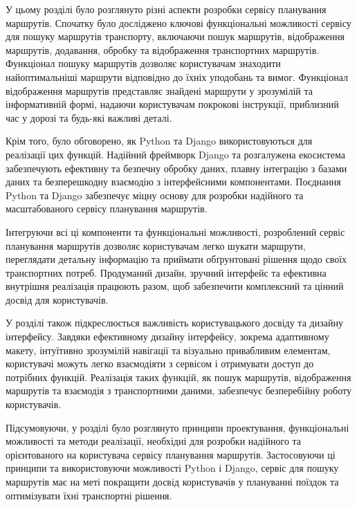
У цьому розділі було розглянуто різні аспекти розробки сервісу планування маршрутів. Спочатку було досліджено ключові функціональні можливості сервісу для пошуку маршрутів транспорту, включаючи пошук маршрутів, відображення маршрутів, додавання, обробку та відображення транспортних маршрутів. Функціонал пошуку маршрутів дозволяє користувачам знаходити найоптимальніші маршрути відповідно до їхніх уподобань та вимог. Функціонал відображення маршрутів представляє знайдені маршрути у зрозумілій та інформативній формі, надаючи користувачам покрокові інструкції, приблизний час у дорозі та будь-які важливі деталі.

Крім того, було обговорено, як Python та Django використовуються для реалізації цих функцій. Надійний фреймворк Django та розгалужена екосистема забезпечують ефективну та безпечну обробку даних, плавну інтеграцію з базами даних та безперешкодну взаємодію з інтерфейсними компонентами. Поєднання Python та Django забезпечує міцну основу для розробки надійного та масштабованого сервісу планування маршрутів.

Інтегруючи всі ці компоненти та функціональні можливості, розроблений сервіс планування маршрутів дозволяє користувачам легко шукати маршрути, переглядати детальну інформацію та приймати обґрунтовані рішення щодо своїх транспортних потреб. Продуманий дизайн, зручний інтерфейс та ефективна внутрішня реалізація працюють разом, щоб забезпечити комплексний та цінний досвід для користувачів.

У розділі також підкреслюється важливість користувацького досвіду та дизайну інтерфейсу. Завдяки ефективному дизайну інтерфейсу, зокрема адаптивному макету, інтуїтивно зрозумілій навігації та візуально привабливим елементам, користувачі можуть легко взаємодіяти з сервісом і отримувати доступ до потрібних функцій. Реалізація таких функцій, як пошук маршрутів, відображення маршрутів та взаємодія з транспортними даними, забезпечує безперебійну роботу користувачів.

Підсумовуючи, у розділі було розглянуто принципи проектування, функціональні можливості та методи реалізації, необхідні для розробки надійного та орієнтованого на користувача сервісу планування маршрутів. Застосовуючи ці принципи та використовуючи можливості Python і Django, сервіс для пошуку маршрутів має на меті покращити досвід користувачів у плануванні поїздок та оптимізувати їхні транспортні рішення.
